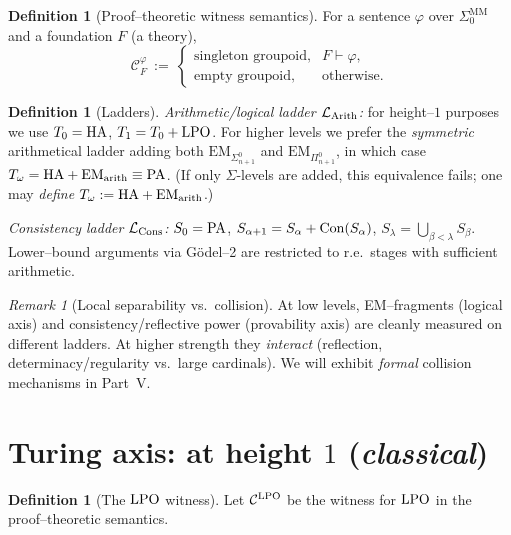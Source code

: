 \documentclass[11pt]{article}
\theoremstyle{definition}
\newtheorem{definition}[theorem]{Definition}
\theoremstyle{remark}
\newtheorem{remark}[theorem]{Remark}
\begin{document}
\begin{definition}[Proof--theoretic witness semantics]
For a sentence \(\varphi\) over \(\Sigma_0^{\mathrm{MM}}\) and a foundation \(F\) (a theory),
\[
\mathcal C^\varphi_F \ :=\
\begin{cases}
\text{singleton groupoid}, & F\vdash \varphi,\\
\text{empty groupoid}, & \text{otherwise.}
\end{cases}
\]
\end{definition}

\begin{definition}[Ladders]\label{III:def:ladders-new}
\emph{Arithmetic/logical ladder \(\mathcal{L}_{\mathrm{Arith}}\):}
for height--\(1\) purposes we use \(T_0=\mathrm{HA}\), \(T_1=T_0+\mathrm{LPO}\).
For higher levels we prefer the \emph{symmetric} arithmetical ladder
adding both \(\mathrm{EM}_{\Sigma^0_{n+1}}\) and \(\mathrm{EM}_{\Pi^0_{n+1}}\), in which case
\(T_\omega=\mathrm{HA}+\mathrm{EM}_{\mathrm{arith}}\equiv \mathrm{PA}\). (If only \(\Sigma\)-levels are added, this
equivalence fails; one may \emph{define} \(T_\omega:=\mathrm{HA}+\mathrm{EM}_{\mathrm{arith}}\).)

\emph{Consistency ladder \(\mathcal{L}_{\mathrm{Cons}}\):}
\(S_0=\mathrm{PA}\), \(S_{\alpha+1}=S_\alpha+\mathrm{Con}(S_\alpha)\), \(S_\lambda=\bigcup_{\beta<\lambda}S_\beta\).
Lower--bound arguments via G\"odel--2 are restricted to r.e.\ stages with sufficient arithmetic.
\end{definition}

\begin{remark}[Local separability vs.\ collision]
At low levels, EM--fragments (logical axis) and consistency/reflective power (provability axis)
are cleanly measured on different ladders. At higher strength they \emph{interact} (reflection,
determinacy/regularity vs.\ large cardinals). We will exhibit \emph{formal} collision mechanisms
in Part~V.
\end{remark}

\section{Turing axis: \texorpdfstring{\LPO}{LPO} at height \(1\) (\emph{classical})}

\begin{definition}[The \(\mathrm{LPO}\) witness]
Let \(\mathcal C^{\mathrm{LPO}}\) be the witness for \(\mathrm{LPO}\) in the proof--theoretic semantics.
\end{definition}
\end{document}

